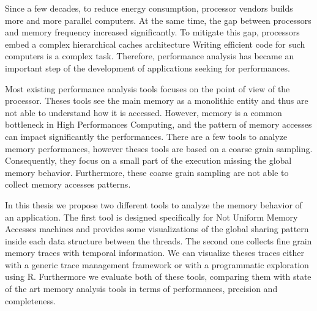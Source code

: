 
Since a few decades, to reduce energy consumption, processor vendors builds more and more parallel computers.
At the same time, the gap between processors and memory frequency increased significantly.
To mitigate this gap, processors embed a complex hierarchical caches architecture
Writing efficient code for such computers is a complex task.
Therefore, performance analysis has became an important step of the development of applications seeking for performances.

Most existing performance analysis tools focuses on the point of view of the processor.
Theses tools see the main memory as a monolithic entity and thus are not able to understand how it is accessed.
However, memory is a common bottleneck in High Performances Computing, and the pattern of memory accesses can impact significantly the performances.
There are a few tools to analyze memory performances, however theses tools are based on a coarse grain sampling.
Consequently, they focus on a small part of the execution missing the global memory behavior.
Furthermore, these coarse grain sampling are not able to collect memory accesses patterns.

In this thesis we propose two different tools to analyze the memory behavior of an application.
The first tool is designed specifically for Not Uniform Memory Accesses machines and provides some visualizations of the global sharing pattern inside each data structure between the threads.
The second one collects fine grain memory traces with temporal information.
We can visualize theses traces either with a generic trace management framework or with a programmatic exploration using R.
Furthermore we evaluate both of these tools, comparing them with state of the art memory analysis tools in terms of performances, precision and completeness.

\glsresetall
